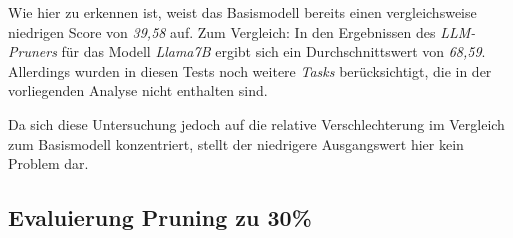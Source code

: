 Wie hier zu erkennen ist, weist das Basismodell bereits einen vergleichsweise
niedrigen Score von \emph{39,58} auf. Zum Vergleich: In den Ergebnissen des
\emph{LLM-Pruners} für das Modell \emph{Llama7B} ergibt sich ein
Durchschnittswert von \emph{68,59}. Allerdings wurden in diesen Tests noch
weitere \emph{Tasks} berücksichtigt, die in der vorliegenden Analyse nicht
enthalten sind.

Da sich diese Untersuchung jedoch auf die relative Verschlechterung im Vergleich
zum Basismodell konzentriert, stellt der niedrigere Ausgangswert hier kein
Problem dar.

\newpage

\subsection{Evaluierung Pruning zu 30\%}

